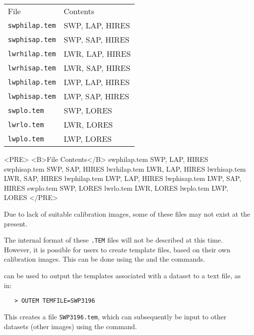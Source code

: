 \begin{latexonly}
\begin{tabular}{ll}
File               & Contents\\
{\tt swphilap.tem} & SWP, LAP, HIRES\\
{\tt swphisap.tem} & SWP, SAP, HIRES\\
{\tt lwrhilap.tem} & LWR, LAP, HIRES\\
{\tt lwrhisap.tem} & LWR, SAP, HIRES\\
{\tt lwphilap.tem} & LWP, LAP, HIRES\\
{\tt lwphisap.tem} & LWP, SAP, HIRES\\
{\tt swplo.tem}    & SWP, LORES\\
{\tt lwrlo.tem}    & LWR, LORES\\
{\tt lwplo.tem}    & LWP, LORES\\
\end{tabular}
\end{latexonly}

\begin{htmlonly}
\begin{rawhtml}
<PRE>
<B>File              Contents</B>
swphilap.tem      SWP, LAP, HIRES
swphisap.tem      SWP, SAP, HIRES
lwrhilap.tem      LWR, LAP, HIRES
lwrhisap.tem      LWR, SAP, HIRES
lwphilap.tem      LWP, LAP, HIRES
lwphisap.tem      LWP, SAP, HIRES
swplo.tem         SWP, LORES
lwrlo.tem         LWR, LORES
lwplo.tem         LWP, LORES
</PRE>
\end{rawhtml}
\end{htmlonly}

Due to lack of suitable calibration images, some of these files may not exist
at the present.

The internal format of these \verb+.TEM+ files will not be described at this
time.  However, it is possible for users to create template files, based on
their own calibration images.  This can be done using the
 and the
 commands.

 can be used to output the templates associated with a dataset to
a text file, as in:

\begin{verbatim}
   > OUTEM TEMFILE=SWP3196
\end{verbatim}

This creates a file \verb+SWP3196.tem+, which can subsequently be input to
other datasets (other images) using the 
 command.

